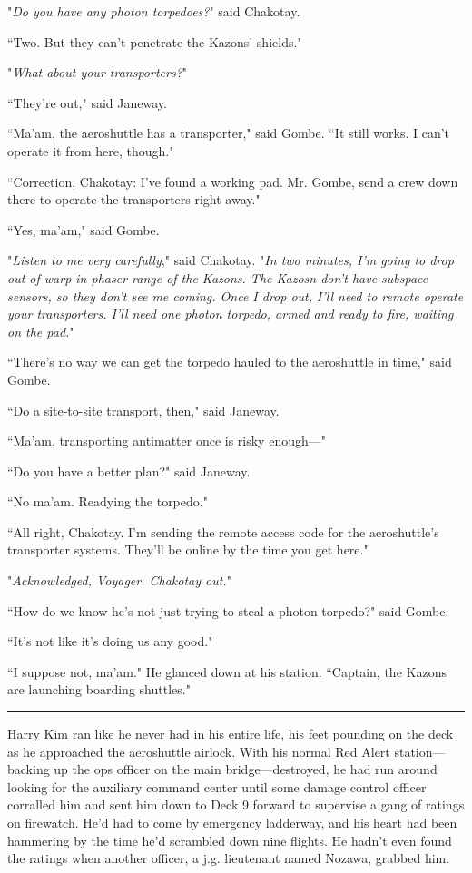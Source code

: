 \documentclass[twoside,letterpaper,12pt]{memoir}
\begin{document}
"\textit{Do you have any photon torpedoes?}" said Chakotay.

``Two. But they can't penetrate the Kazons' shields."

"\textit{What about your transporters?}"

``They're out," said Janeway.

``Ma'am, the aeroshuttle has a transporter," said Gombe. ``It still works. I can't operate it from here, though."

``Correction, Chakotay: I've found a working pad. Mr. Gombe, send a crew down there to operate the transporters right away."

``Yes, ma'am," said Gombe.

"\textit{Listen to me very carefully}," said Chakotay. "\textit{In two minutes, I'm going to drop out of warp in phaser range of the Kazons. The Kazosn don't have subspace sensors, so they don't see me coming. Once I drop out, I'll need to remote operate your transporters. I’ll need one photon torpedo, armed and ready to fire, waiting on the pad.}"

``There's no way we can get the torpedo hauled to the aeroshuttle in time," said Gombe.

``Do a site-to-site transport, then," said Janeway.

``Ma'am, transporting antimatter once is risky enough---"

``Do you have a better plan?" said Janeway.

``No ma'am. Readying the torpedo."

``All right, Chakotay. I'm sending the remote access code for the aeroshuttle's transporter systems. They'll be online by the time you get here."

"\textit{Acknowledged, Voyager. Chakotay out.}"

``How do we know he's not just trying to steal a photon torpedo?" said Gombe.

``It's not like it's doing us any good."

``I suppose not, ma'am." He glanced down at his station. ``Captain, the Kazons are launching boarding shuttles."

\fancybreak{\rule{3cm}{0.4 pt}}
Harry Kim ran like he never had in his entire life, his feet pounding on the deck as he approached the aeroshuttle airlock. With his normal Red Alert station---backing up the ops officer on the main bridge---destroyed, he had run around looking for the auxiliary command center until some damage control officer corralled him and sent him down to Deck 9 forward to supervise a gang of ratings on firewatch. He'd had to come by emergency ladderway, and his heart had been hammering by the time he'd scrambled down nine flights. He hadn't even found the ratings when another officer, a j.g. lieutenant named Nozawa, grabbed him.
\end{document}

